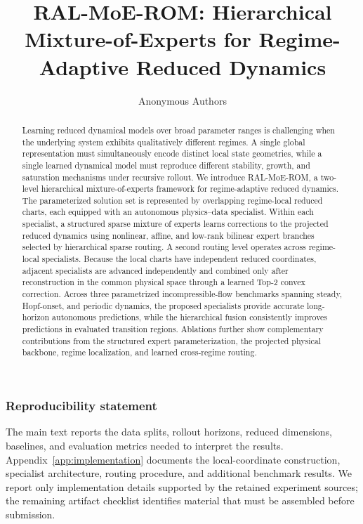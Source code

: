 \documentclass{article}
\title{RAL-MoE-ROM: Hierarchical Mixture-of-Experts for Regime-Adaptive Reduced Dynamics}
\author{Anonymous Authors}
\begin{document}
\maketitle

\begin{abstract}
Learning reduced dynamical models over broad parameter ranges is challenging when the underlying system exhibits qualitatively different regimes. A single global representation must simultaneously encode distinct local state geometries, while a single learned dynamical model must reproduce different stability, growth, and saturation mechanisms under recursive rollout. We introduce RAL-MoE-ROM, a two-level hierarchical mixture-of-experts framework for regime-adaptive reduced dynamics. The parameterized solution set is represented by overlapping regime-local reduced charts, each equipped with an autonomous physics--data specialist. Within each specialist, a structured sparse mixture of experts learns corrections to the projected reduced dynamics using nonlinear, affine, and low-rank bilinear expert branches selected by hierarchical sparse routing. A second routing level operates across regime-local specialists. Because the local charts have independent reduced coordinates, adjacent specialists are advanced independently and combined only after reconstruction in the common physical space through a learned Top-2 convex correction. Across three parametrized incompressible-flow benchmarks spanning steady, Hopf-onset, and periodic dynamics, the proposed specialists provide accurate long-horizon autonomous predictions, while the hierarchical fusion consistently improves predictions in evaluated transition regions. Ablations further show complementary contributions from the structured expert parameterization, the projected physical backbone, regime localization, and learned cross-regime routing.
\end{abstract}





\FloatBarrier



\subsubsection*{Reproducibility statement}
The main text reports the data splits, rollout horizons, reduced dimensions, baselines, and evaluation metrics needed to interpret the results. Appendix~\ref{app:implementation} documents the local-coordinate construction, specialist architecture, routing procedure, and additional benchmark results. We report only implementation details supported by the retained experiment sources; the remaining artifact checklist identifies material that must be assembled before submission.
\end{document}
